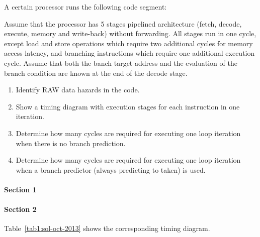 \clearpage
\begin{acexercise}
\label{ex:m4-01:instr-03}
\end{acexercise}

A certain processor runs the following code segment:



Assume that the processor has 5 stages pipelined architecture (fetch,
decode, execute, memory and write-back) without forwarding. All stages
run in one cycle, except load and store operations which require two additional
cycles for memory access latency, and branching instructions which require
one additional execution cycle. Assume that both the banch target address
and the evaluation of the branch condition are known at the end of the 
decode stage.

\begin{enumerate}

  \item Identify RAW data hazards in the code.

  \item Show a timing diagram with execution stages for each instruction in
        one iteration.

  \item Determine how many cycles are required for executing one loop iteration
        when there is no branch prediction.

  \item Determine how many cycles are required for executing one loop iteration
        when a branch predictor (always predicting to taken) is used.

\end{enumerate}

\begin{acsolution}\end{acsolution}


\paragraph{Section 1}



\paragraph{Section 2}

Table~\ref{tab1:sol-oct-2013} shows the corresponding timing diagram.

